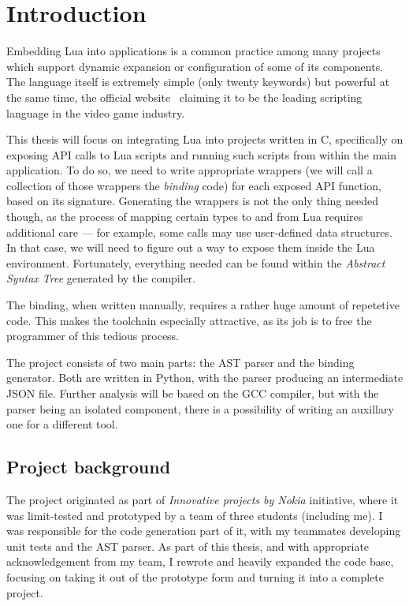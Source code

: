 \documentclass[polish, english]{iithesis}
\author{Mateusz Łuczyński}
\date{\today}
\begin{document}
\chapter{Introduction}
Embedding Lua into applications is a common practice among many projects which support dynamic expansion or configuration of some of its components.
The language itself is extremely simple (only twenty keywords) but powerful at the same time, the official website~\cite{lua-web} claiming it to be the leading scripting language in the video game industry.

This thesis will focus on integrating Lua into projects written in C, specifically on exposing API calls to Lua scripts and running such scripts from within the main application.
To do so, we need to write appropriate wrappers (we will call a collection of those wrappers the \textit{binding} code) for each exposed API function, based on its signature.
Generating the wrappers is not the only thing needed though, as the process of mapping certain types to and from Lua requires additional care --- for example, some calls may use user-defined data structures.
In that case, we will need to figure out a way to expose them inside the Lua environment.
Fortunately, everything needed can be found within the \textit{Abstract Syntax Tree} generated by the compiler. 

The binding, when written manually, requires a rather huge amount of repetetive code.
This makes the toolchain especially attractive, as its job is to free the programmer of this tedious process.

The project consists of two main parts: the AST parser and the binding generator.
Both are written in Python, with the parser producing an intermediate JSON file.
Further analysis will be based on the GCC compiler, but with the parser being an isolated component, there is a possibility of writing an auxillary one for a different tool.

  \section{Project background}
The project originated as part of \textit{Innovative projects by Nokia} initiative, where it was limit-tested and prototyped by a team of three students (including me).
I was responsible for the code generation part of it, with my teammates developing unit tests and the AST parser. 
As part of this thesis, and with appropriate acknowledgement from my team, I rewrote and heavily expanded the code base, focusing on taking it out of the prototype form and turning it into a complete project.
\end{document}
